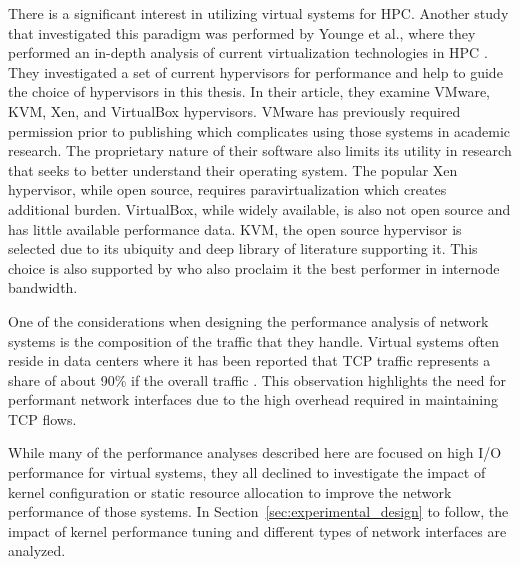 There is a significant interest in utilizing virtual systems for HPC.  Another study that investigated this paradigm was performed by Younge et al., where they performed an in-depth analysis of current virtualization technologies in HPC \autocite{_younge_1}.
They investigated a set of current hypervisors for performance and help to guide the choice of hypervisors in this thesis. 
In their article, they examine VMware, KVM, Xen, and VirtualBox hypervisors. 
VMware has previously required permission prior to publishing which complicates using those systems in academic research.  
The proprietary nature of their software also limits its utility in research that seeks to better understand their operating system.  
The popular Xen hypervisor, while open source, requires paravirtualization which creates additional burden.
VirtualBox, while widely available, is also not open source and has little available performance data.  
KVM, the open source hypervisor is selected due to its ubiquity and deep library of literature supporting it.
This choice is also supported by \autocite{_younge_1} who also proclaim it the best performer in internode bandwidth.  

One of the considerations when designing the performance analysis of network systems is the composition of the traffic that they handle.  
Virtual systems often reside in data centers where it has been reported that TCP traffic represents a share of about 90\% if the overall traffic \autocite{haTCPCloud2013}.
This observation highlights the need for performant network interfaces due to the high overhead required in maintaining TCP flows.

While many of the performance analyses described here are focused on high I/O performance for virtual systems, they all declined to investigate the impact of kernel configuration or static resource allocation to improve the network performance of those systems.  
In Section~\ref{sec:experimental_design} to follow, the impact of kernel performance tuning and different types of network interfaces are analyzed.  



\nocite{_dpdk_1, _adams_1, _chowdhury_1, seo2014performance, gomes2014performance, kivity2014osv, wang2011understanding}

